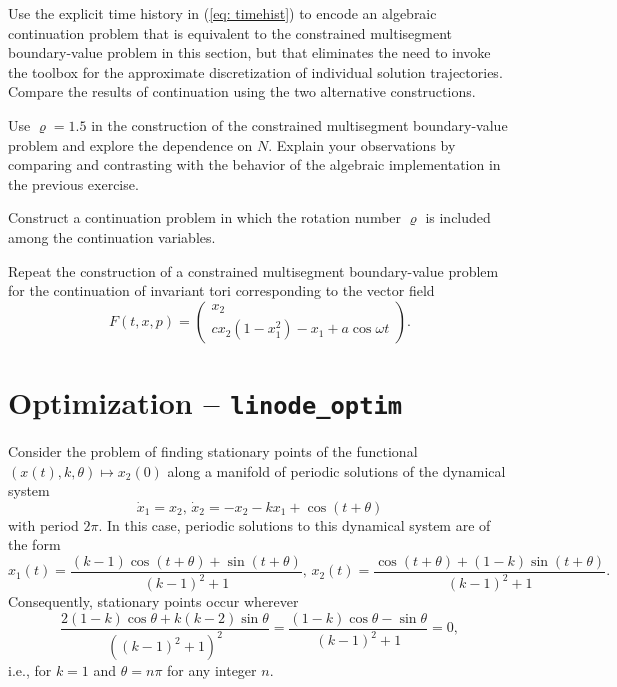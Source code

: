 \begin{exercises}
\item Use the explicit time history in (\ref{eq: timehist}) to encode an algebraic continuation problem that is equivalent to the constrained multisegment boundary-value problem in this section, but that eliminates the need to invoke the  toolbox for the approximate discretization of individual solution trajectories. Compare the results of continuation using the two alternative constructions.
\item Use $\varrho=1.5$ in the construction of the constrained multisegment boundary-value problem and explore the dependence on $N$. Explain your observations by comparing and contrasting with the behavior of the algebraic implementation in the previous exercise.
\item Construct a continuation problem in which the rotation number $\varrho$ is included among the continuation variables.
\item Repeat the construction of a constrained multisegment boundary-value problem for the continuation of invariant tori corresponding to the vector field
\[
F(t,x,p) = \left(\begin{array}{c}x_2\\cx_2(1-x_1^2)-x_1+a\cos\omega t\end{array}\right).
\]
\end{exercises}

\section{Optimization -- \texttt{linode\_optim}}
Consider the problem of finding stationary points of the functional $(x(t),k,\theta)\mapsto x_2(0)$ along a manifold of periodic solutions of the dynamical system
\begin{equation}
\dot{x}_1=x_2,\,\dot{x}_2=-x_2-kx_1+\cos (t+\theta)
\end{equation}
with period $2\pi$. In this case, periodic solutions to this dynamical system are of the form
\begin{equation}
\label{eq: linodeexplicit}
x_1(t)=\frac{(k-1)\cos(t+\theta)+\sin(t+\theta)}{(k-1)^2+1},\,x_2(t)=\frac{\cos(t+\theta)+(1-k)\sin(t+\theta)}{(k-1)^2+1}.
\end{equation}
Consequently, stationary points occur wherever
\begin{equation}
\frac{2(1-k)\cos\theta+k(k-2)\sin\theta}{\left((k-1)^2+1\right)^2}=\frac{(1-k)\cos\theta-\sin\theta}{(k-1)^2+1}=0,
\end{equation}
i.e., for $k=1$ and $\theta=n\pi$ for any integer $n$.

